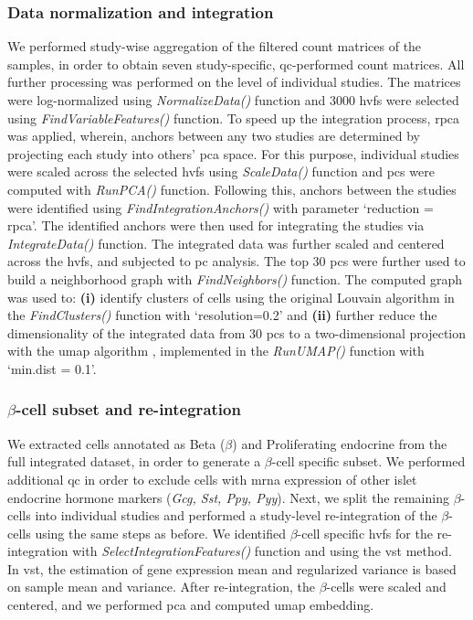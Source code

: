 \subsubsection{\large Data normalization and integration}
\label{subsubsec:met_chp3_integration}
We performed study-wise aggregation of the filtered count matrices of the samples, in order to obtain seven study-specific, \gls{qc}-performed count matrices. All further processing was performed on the level of individual studies. The matrices were log-normalized using \textit{NormalizeData()} function and 3000 \glspl{hvf} were selected using \textit{FindVariableFeatures()} function. To speed up the integration process, \gls{rpca} was applied, wherein, anchors between any two studies are determined by projecting each study into others’ \gls{pca} space. For this purpose, individual studies were scaled across the selected \glspl{hvf} using \textit{ScaleData()} function and \glspl{pc} were computed with \textit{RunPCA()} function. Following this, anchors between the studies were identified using \textit{FindIntegrationAnchors()} with parameter `reduction = rpca'. The identified anchors were then used for integrating the studies via \textit{IntegrateData()} function. The integrated data was further scaled and centered across the \glspl{hvf}, and subjected to \gls{pc} analysis. The top 30 \glspl{pc} were further used to build a neighborhood graph with \textit{FindNeighbors()} function. The computed graph was used to: \textbf{(i)} identify clusters of cells using the original Louvain algorithm \textbf{\cite{blondel_fast_2008}} in the \textit{FindClusters()} function with `resolution=0.2' and \textbf{(ii)} further reduce the dimensionality of the integrated data from 30 \glspl{pc} to a two-dimensional projection with the \gls{umap} algorithm \textbf{\cite{mcinnes_umap_2018}}, implemented in the \textit{RunUMAP()} function with `min.dist = 0.1'.

\subsubsection{\large $\beta$-cell subset and re-integration}
\label{subsubsec:met_chp3_betareint}
\par We extracted cells annotated as Beta ($\beta$) and Proliferating endocrine from the full integrated dataset, in order to generate a $\beta$-cell specific subset. We performed additional \gls{qc} in order to exclude cells with \gls{mrna} expression of other islet endocrine hormone markers (\textit{Gcg, Sst, Ppy, Pyy}). Next, we split the remaining $\beta$-cells into individual studies and performed a study-level re-integration of the $\beta$-cells using the same steps as before. We identified $\beta$-cell specific \glspl{hvf} for the re-integration with \textit{SelectIntegrationFeatures()} function and using the \gls{vst} method. In \gls{vst}, the estimation of gene expression mean and regularized variance is based on sample mean and variance. After re-integration, the $\beta$-cells were scaled and centered, and we performed \gls{pca} and computed \gls{umap} embedding.\\

